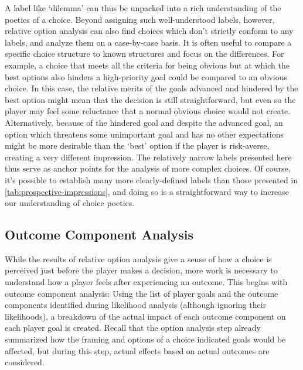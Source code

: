 A label like `dilemma' can thus be unpacked into a rich understanding of the poetics of a choice.
%
Beyond assigning such well-understood labels, however, relative option analysis can also find choices which don't strictly conform to any labels, and analyze them on a case-by-case basis.
%
It is often useful to compare a specific choice structure to known structures and focus on the differences.
%
For example, a choice that meets all the criteria for being obvious but at which the best options also hinders a high-priority goal could be compared to an obvious choice.
%
In this case, the relative merits of the goals advanced and hindered by the best option might mean that the decision is still straightforward, but even so the player may feel some reluctance that a normal obvious choice would not create.
%
Alternatively, because of the hindered goal and despite the advanced goal, an option which threatens some unimportant goal and has no other expectations might be more desirable than the `best' option if the player is risk-averse, creating a very different impression.
%
The relatively narrow labels presented here thus serve as anchor points for the analysis of more complex choices.
%
Of course, it's possible to establish many more clearly-defined labels than those presented in \cref{tab:prospective-impressions}, and doing so is a straightforward way to increase our understanding of choice poetics.


\subsection{Outcome Component Analysis}

While the results of relative option analysis give a sense of how a choice is perceived just before the player makes a decision, more work is necessary to understand how a player feels after experiencing an outcome.
%
This begins with outcome component analysis: Using the list of player goals and the outcome components identified during likelihood analysis (although ignoring their likelihoods), a breakdown of the actual impact of each outcome component on each player goal is created.
%
Recall that the option analysis step already summarized how the framing and options of a choice indicated goals would be affected, but during this step, actual effects based on actual outcomes are considered.


